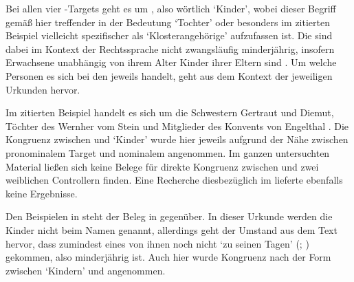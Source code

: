 Bei allen vier -Targets geht es um , also wörtlich
`Kinder', wobei dieser Begriff gemäß \citet[s.\,v.~]{lexer:mhdhwb}
hier treffender in der Bedeutung `Tochter' %
oder besonders im zitierten Beispiel vielleicht spezifischer als
`Klosterangehörige'
aufzufassen ist. Die  sind dabei im Kontext der Rechtssprache nicht
zwangsläufig minderjährig, insofern Erwachsene unabhängig von ihrem Alter
Kinder ihrer Eltern sind \autocites[vgl.][1736]{schwab2012}[siehe
auch][258--259]{birkenesfleischer2022}. Um welche Personen es sich bei den
 jeweils handelt, geht aus dem Kontext der jeweiligen Urkunden
hervor.

Im zitierten Beispiel handelt es sich um
die Schwestern Gertraut und Diemut, Töchter des Wernher vom Stein und
Mitglieder des Konvents von Engelthal \autocite[Kr.~Nürnberger Land;
vgl.][619]{caor}. Die Kongruenz zwischen  und  `Kinder'
wurde hier jeweils aufgrund der Nähe zwischen pronominalem Target und nominalem
 angenommen. Im ganzen unter\-suchten Material ließen sich
keine Belege für direkte Kongruenz zwischen  und zwei weiblichen
Controllern finden. Eine Recherche diesbezüglich im \REM{}
lieferte ebenfalls keine Ergeb\-nisse.

Den Beispielen in  steht der Beleg in
 gegenüber. In dieser Urkunde werden die Kinder
nicht beim Namen genannt, allerdings geht der Umstand aus dem Text hervor, dass
zumindest eines von ihnen noch nicht  `zu seinen Tagen'
(\cites(Nr.~214)[218,18--19]{cao1}; \cite[vgl.][26]{caor}) gekommen, also
minderjährig ist. Auch hier wurde Kongruenz nach der Form zwischen
 `Kindern' und  angenommen.

\begin{exe}
\end{exe}


